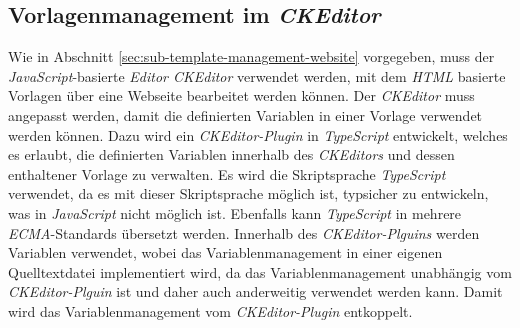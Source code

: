 \subsection{Vorlagenmanagement im \emph{CKEditor}}
\label{sec:sub-typescript-javascript}
Wie in Abschnitt \ref{sec:sub-template-management-website} vorgegeben, muss der \emph{JavaScript}-basierte \emph{Editor CKEditor} verwendet werden, mit dem \emph{HTML} basierte Vorlagen über eine Webseite bearbeitet werden können. Der \emph{CKEditor} muss angepasst werden, damit die definierten Variablen in einer Vorlage verwendet werden können. 
\newline
\newline
Dazu wird ein \emph{CKEditor-Plugin} in \emph{TypeScript} entwickelt, welches es erlaubt, die definierten Variablen innerhalb des \emph{CKEditors} und dessen enthaltener Vorlage zu verwalten. Es wird die Skriptsprache \emph{TypeScript} verwendet, da es mit dieser Skriptsprache möglich ist, typsicher zu entwickeln, was in \emph{JavaScript} nicht möglich ist. Ebenfalls kann \emph{TypeScript} in mehrere \emph{ECMA}-Standards übersetzt werden.
\newline
\newline
Innerhalb des \emph{CKEditor-Plguins} werden Variablen verwendet, wobei das Variablenmanagement in einer eigenen Quelltextdatei implementiert wird, da das Variablenmanagement unabhängig vom \emph{CKEditor-Plguin} ist und daher auch anderweitig verwendet werden kann. Damit wird das Variablenmanagement vom \emph{CKEditor-Plugin} entkoppelt.

